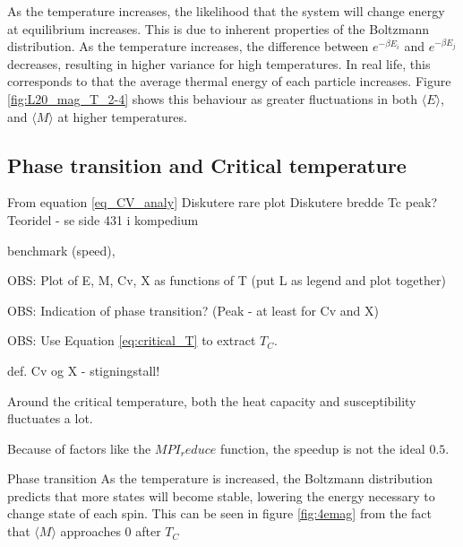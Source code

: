 As the temperature increases, the likelihood that the system will change  energy at equilibrium increases. This is due to inherent properties of the Boltzmann distribution. As the temperature increases, the difference between $ e^{-\beta E_i} $ and $ e^{-\beta E_j} $ decreases, resulting in higher variance for high temperatures. In real life, this corresponds to that the average thermal energy of each particle increases. Figure \ref{fig:L20_mag_T_2-4} shows this behaviour as greater fluctuations in both $\langle E \rangle  $, and $\langle M \rangle  $ at higher temperatures. 
 

\subsection{Phase transition and Critical temperature}

From equation \ref{eq_CV_analy}
Diskutere rare plot
Diskutere bredde Tc peak? Teoridel - se side 431 i kompedium

benchmark (speed),

OBS: Plot of E, M, Cv, X as functions of T (put L as legend and plot together)

OBS: Indication of phase transition? (Peak - at least for Cv and X)

OBS: Use Equation \ref{eq:critical_T} to extract $T_C$.

def. Cv og X - stigningstall!

Around the critical temperature, both the heat capacity and susceptibility fluctuates a lot. 



Because of factors like the $MPI_reduce$ function, the speedup is not the ideal $ 0.5 $. 



Phase transition
As the temperature is increased, the Boltzmann distribution predicts that more states will become stable, lowering the energy necessary to change state of each spin. This can be seen  in figure \ref{fig:4emag} from the fact that $ \langle M \rangle $ approaches 0 after $ T_C $
